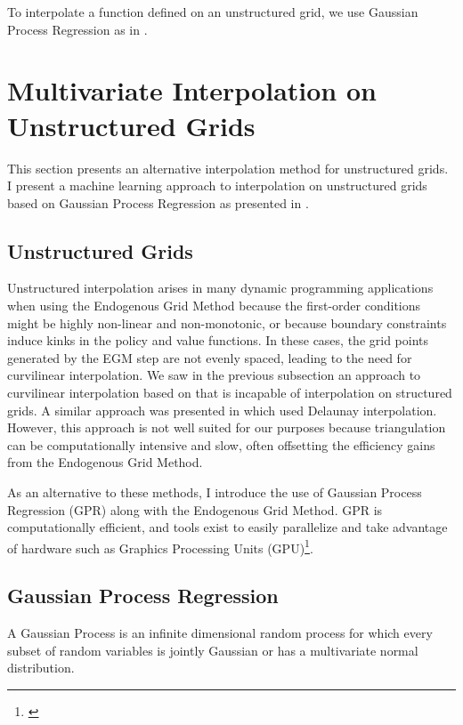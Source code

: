\documentclass{article}
\begin{document}
To interpolate a function defined on an unstructured grid, we use Gaussian Process Regression as in \citet{Scheidegger2019}.

\section{Multivariate Interpolation on Unstructured Grids}\label{multinterp}

This section presents an alternative interpolation method for unstructured grids. I present a machine learning approach to interpolation on unstructured grids based on Gaussian Process Regression as presented in \citet{Scheidegger2019}.

\subsection{Unstructured Grids}\label{Unstructured Grids}

Unstructured interpolation arises in many dynamic programming applications when using the Endogenous Grid Method because the first-order conditions might be highly non-linear and non-monotonic, or because boundary constraints induce kinks in the policy and value functions. In these cases, the grid points generated by the EGM step are not evenly spaced, leading to the need for curvilinear interpolation. We saw in the previous subsection an approach to curvilinear interpolation based on \citet{White2015} that is incapable of interpolation on structured grids. A similar approach was presented in \citet{Ludwig2018} which used Delaunay interpolation. However, this approach is not well suited for our purposes because triangulation can be computationally intensive and slow, often offsetting the efficiency gains from the Endogenous Grid Method.

As an alternative to these methods, I introduce the use of Gaussian Process Regression (GPR) along with the Endogenous Grid Method. GPR is computationally efficient, and tools exist to easily parallelize and take advantage of hardware such as Graphics Processing Units (GPU)\footnote{\citet{Gardner2018}}.


\subsection{Gaussian Process Regression}\label{Gaussian Process Regression}

A Gaussian Process is an infinite dimensional random process for which every subset of random variables is jointly Gaussian or has a multivariate normal distribution.
\end{document}
